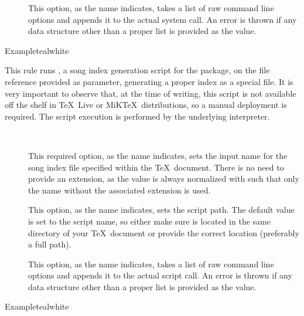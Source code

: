\begin{description}
\begin{description}
\item[] This option, as the name indicates, takes a list of raw command line options and appends it to the actual system call. An error is thrown if any data structure other than a proper list is provided as the value.
\end{description}

\begin{codebox}{Example}{teal}{\icnote}{white}
\end{codebox}

\item[\rulebox{songidx}]
This rule runs , a song index generation script for the  package, on the file reference provided as parameter, generating a proper index as a special  file. It is very important to observe that, at the time of writing, this script is not available off the shelf in \TeX\ Live or MiK\TeX\ distributions, so a manual deployment is required. The script execution is performed by the underlying  interpreter.

\begin{description}
\item[~\rqbox] This required option, as the name indicates, sets the input name for the song index file specified within the \TeX\ document. There is no need to provide an extension, as the value is always normalized with  such that only the name without the associated extension is used.

\item[] This option, as the name indicates, sets the script path. The default value is set to the script name, so either make sure  is located in the same directory of your \TeX\ document or provide the correct location (preferably a full path).

\item[] This option, as the name indicates, takes a list of raw command line options and appends it to the actual script call. An error is thrown if any data structure other than a proper list is provided as the value.
\end{description}

\begin{codebox}{Example}{teal}{\icnote}{white}
\end{codebox}


\end{description}
